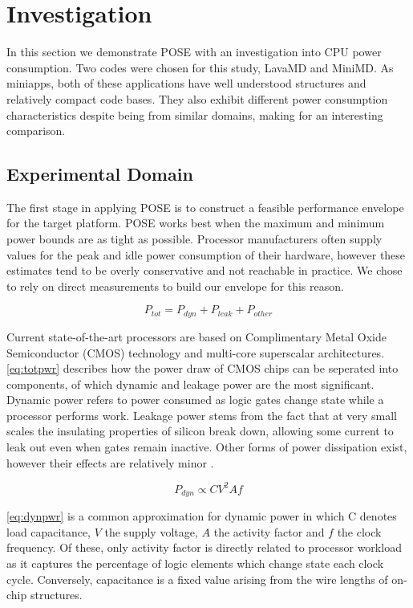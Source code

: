 \section{Investigation}
\label{sec:investigation}
In this section we demonstrate POSE with an investigation into CPU power consumption.
Two codes were chosen for this study, LavaMD and MiniMD.
As miniapps, both of these applications have well understood structures and relatively compact code bases.
They also exhibit different power consumption characteristics despite being from similar domains, making for an interesting comparison.

\subsection{Experimental Domain}
The first stage in applying POSE is to construct a feasible performance envelope for the target platform.
POSE works best when the maximum and minimum power bounds are as tight as possible.
Processor manufacturers often supply values for the peak and idle power consumption of their hardware, however these estimates tend to be overly conservative and not reachable in practice.
We chose to rely on direct measurements to build our envelope for this reason.

\begin{equation}
\label{eq:totpwr}
P_{tot} = P_{dyn} + P_{leak} + P_{other}
\end{equation}

Current state-of-the-art processors are based on Complimentary Metal Oxide Semiconductor (CMOS) technology and multi-core superscalar architectures.
\autoref{eq:totpwr} describes how the power draw of CMOS chips can be seperated into components, of which dynamic and leakage power are the most significant.
Dynamic power refers to power consumed as logic gates change state while a processor performs work. 
Leakage power stems from the fact that at very small scales the insulating properties of silicon break down, allowing some current to leak out even when gates remain inactive.
Other forms of power dissipation exist, however their effects are relatively minor \cite{kaxiras:2008aa}.

\begin{equation} 
\label{eq:dynpwr}
P_{dyn} \propto CV^{2}Af
\end{equation}

\autoref{eq:dynpwr} is a common approximation for dynamic power in which C denotes load capacitance, $V$ the supply voltage, $A$ the activity factor and $f$ the clock frequency.
Of these, only activity factor is directly related to processor workload as it captures the percentage of logic elements which change state each clock cycle.
Conversely, capacitance is a fixed value arising from the wire lengths of on-chip structures.

